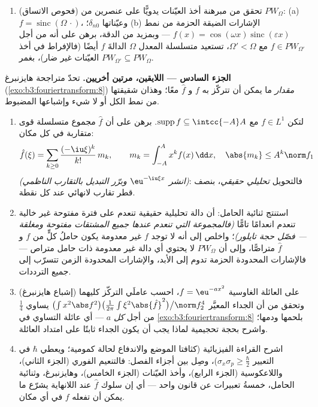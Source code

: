 \begin{problem}[{مسألة نهاية الأسبوع --- $\partial_tu =
\partial^2_{xx}u$، محلولةً من
أولها إلى آخرها}]
\begin{enumerate}[resume]
        بنحو $\frac{\Omega T}\pi$ عيّنة حقيقية --- واضبط معنى «جوهريًّا»
        بواسطة متطابقة الطاقة والذيل $\sum_{\abs{n\pi/\Omega} >
        T/2}$.
  \item (فحوص الاتساق) تحقق من مبرهنة أخذ العيّنات يدويًّا
        على عنصرين من $PW_\Omega$: (a) $f =
        \operatorname{sinc}(\Omega\,\cdot)$، وعيّناتها
        $\delta_{n0}$؛ (b) الإشارات الضيقة الحزمة من نمط
        $f(x) = \cos(\omega x)
        \operatorname{sinc}(\varepsilon x)$ --- وبمزيد من الدقة، برهن على أنه من أجل
        $f \in
        PW_{\Omega'}$ مع $\Omega' < \Omega$، تستعيد متسلسلة المعدل $\Omega$
        الدالةَ $f$ أيضًا (فالإفراط في أخذ العيّنات غير ضار)،
        بغمر $PW_
        {\Omega'} \subseteq PW_\Omega$.
\end{enumerate}

\medskip
\noindent\textbf{الجزء السادس --- اللايقين، مرتين أخريين.}
تحدّ متراجحة هايزنبرغ (\cref{exo:b3:fouriertransform:8}) \emph{مقدار} ما يمكن أن
تتركّز به $f$ و $\hat f$ معًا؛ وهذان شقيقتها من نمط الكل أو
لا شيء وإشباعها المضبوط.
\begin{enumerate}[resume]
  \item لتكن $f \in L^1$ مع $\operatorname{supp}f \subseteq
        \intcc{-A}A$. برهن على أن $\hat f$
        مجموع متسلسلة قوى متقاربة في كل مكان:
        \[
        \hat f(\xi) = \sum_{k\geq0}\frac{(-\iu\xi)^k}{k!}
        \,m_k, \qquad m_k = \int_{-A}^{A}x^kf(x)\,\dd x,
        \quad \abs{m_k} \leq A^k\norm f_1
        \]
        \emph{(انشر $\eu^{-\iu\xi x}$ وبرّر التبديل بالتقارب
        الناظمي)}: فالتحويل \emph{تحليلي حقيقي}، بنصف قطر
        تقارب لانهائي عند كل نقطة.
  \item استنتج ثنائية الحامل: أن دالة تحليلية حقيقية تنعدم
        على فترة مفتوحة غير خالية تنعدم انعدامًا تامًّا
        \emph{(فالمجموعة التي تنعدم عندها جميع المشتقات
        مفتوحة ومغلقة --- فصّل حجة تايلور)}؛ واخلص إلى أنه لا
        توجد $f$ غير معدومة يكون حاملُ كلٍّ من $f$ و
        $\hat f$ متراصًّا، وإلى أن $PW_\Omega$ لا يحتوي أي
        دالة غير معدومة ذات حامل متراص --- فالإشارات المحدودة
        الحزمة تدوم إلى الأبد، والإشارات المحدودة الزمن
        تتسرّب إلى جميع الترددات.
  \item (إشباع هايزنبرغ) على العائلة الغاوسية $f
        = \eu^{-ax^2}$، احسب
        عاملَي التركّز كليهما وتحقق من أن الجداء المعيَّر
        $\bigl(\int x^2\abs f^2\bigr)\bigl(\frac1{2\pi}\int
        \xi^2\abs{\hat f}^2\bigr)\big/\norm f_2^4$ يساوي $\frac14$ من أجل \emph{كل} $a$ --- أي
        عائلة التساوي في \cref{exo:b3:fouriertransform:8} بلحمها ودمها؛ واشرح بحجة
        تحجيمية لماذا يجب أن يكون الجداء ثابتًا على امتداد
        العائلة.
  \item اشرح القراءة الفيزيائية (كثافتا الموضع والاندفاع
        لحالة كمومية؛ ويعطي $\hbar$ في التعيير $\sigma_x\sigma_p \geq
        \frac\hbar2$)، وصِل
        بين أجزاء الفصل: فالتنعيم الفوري (الجزء الثاني)،
        واللاعكوسية (الجزء الرابع)، وأخذ العيّنات (الجزء
        الخامس)، وهايزنبرغ، وثنائية الحامل، خمسةُ تعبيرات عن
        قانون واحد --- أي إن سلوك $\hat f$ عند اللانهاية يشرّع
        ما يمكن أن تفعله $f$ في أي مكان.
\end{enumerate}


\end{problem}
